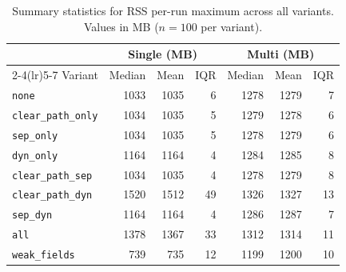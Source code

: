 \begin{table}[t]
\centering
\caption{Summary statistics for RSS per-run maximum across all variants. Values in MB ($n=100$ per variant).}
\label{tab:stats-memory-rss}
\begin{tabular}{l rrr rrr}
\toprule
 & \multicolumn{3}{c}{Single (MB)} & \multicolumn{3}{c}{Multi (MB)} \\
\cmidrule(lr){2-4}\cmidrule(lr){5-7}
Variant & Median & Mean & IQR & Median & Mean & IQR \\
\midrule
\texttt{none} & 1033 & 1035 & 6 & 1278 & 1279 & 7 \\
\texttt{clear\_path\_only} & 1034 & 1035 & 5 & 1279 & 1278 & 6 \\
\texttt{sep\_only} & 1034 & 1035 & 5 & 1278 & 1279 & 6 \\
\texttt{dyn\_only} & 1164 & 1164 & 4 & 1284 & 1285 & 8 \\
\texttt{clear\_path\_sep} & 1034 & 1035 & 4 & 1278 & 1279 & 8 \\
\texttt{clear\_path\_dyn} & 1520 & 1512 & 49 & 1326 & 1327 & 13 \\
\texttt{sep\_dyn} & 1164 & 1164 & 4 & 1286 & 1287 & 7 \\
\texttt{all} & 1378 & 1367 & 33 & 1312 & 1314 & 11 \\
\texttt{weak\_fields} & 739 & 735 & 12 & 1199 & 1200 & 10 \\
\bottomrule
\end{tabular}
\end{table}
